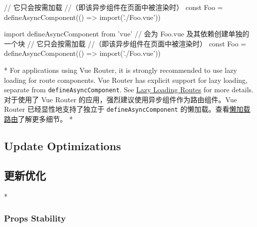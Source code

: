 \begin{paracol}{2}
\begin{codeJs}
// 它只会按需加载
//（即该异步组件在页面中被渲染时）
const Foo = defineAsyncComponent(() => import('./Foo.vue'))
\end{codeJs}
\switchcolumn
\begin{codeJs}
import { defineAsyncComponent } from 'vue'
// 会为 Foo.vue 及其依赖创建单独的一个块
// 它只会按需加载
//（即该异步组件在页面中被渲染时）
const Foo = defineAsyncComponent(() => import('./Foo.vue'))
\end{codeJs}
\switchcolumn[0]*%
For applications using Vue Router, it is strongly recommended to use
lazy loading for route components. Vue Router has explicit support for
lazy loading, separate from \texttt{defineAsyncComponent}. See
\href{https://router.vuejs.org/guide/advanced/lazy-loading.html}{Lazy
Loading Routes} for more details.
\switchcolumn
对于使用了 Vue Router 的应用，强烈建议使用异步组件作为路由组件。Vue
Router 已经显性地支持了独立于 \texttt{defineAsyncComponent}
的懒加载。查看\href{https://router.vuejs.org/zh/guide/advanced/lazy-loading.html}{懒加载路由}了解更多细节。
\switchcolumn[0]*%
\subsection{Update Optimizations}
\switchcolumn
\subsection{更新优化}
\switchcolumn[0]*%
\subsubsection{Props Stability}
\switchcolumn

\end{paracol}
